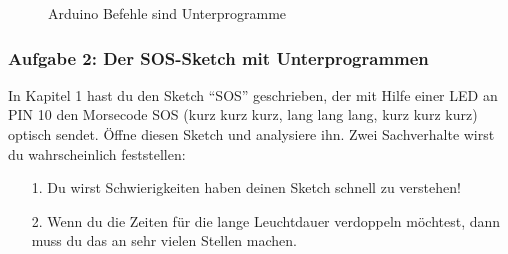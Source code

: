 \begin{figure}[h]
  \begin{center}
  \caption{Arduino Befehle sind Unterprogramme}
  \label{tab:unterprogramme}
  \end{center}
\end{figure}

\subsubsection{Aufgabe 2: Der SOS-Sketch mit Unterprogrammen} 

In Kapitel 1 hast du den Sketch ``SOS'' geschrieben, der mit Hilfe einer LED an PIN 10 den Morsecode SOS (kurz kurz kurz, lang lang lang, kurz kurz kurz) optisch sendet. Öffne diesen Sketch und analysiere ihn. Zwei Sachverhalte wirst du wahrscheinlich feststellen:

\begin{itemize}
\item[1.] Du wirst Schwierigkeiten haben deinen Sketch schnell zu verstehen! 
\item[2.] Wenn du die Zeiten für die lange Leuchtdauer verdoppeln möchtest, dann muss du das an sehr vielen Stellen machen. 
\end{itemize}

